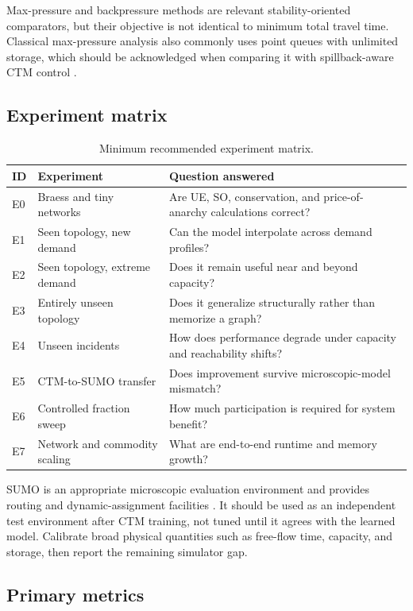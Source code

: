 \documentclass[11pt]{article}
\begin{document}
Max-pressure and backpressure methods are relevant stability-oriented comparators, but
their objective is not identical to minimum total travel time.  Classical max-pressure
analysis also commonly uses point queues with unlimited storage, which should be
acknowledged when comparing it with spillback-aware CTM control \citep{varaiya2013}.

\subsection{Experiment matrix}

\begin{table}[ht]
\centering
\caption{Minimum recommended experiment matrix.}
\label{tab:experiments}
\begin{tabularx}{\textwidth}{@{}p{}p{}X@{}}
\toprule
ID & Experiment & Question answered \\
\midrule
E0 & Braess and tiny networks & Are UE, SO, conservation, and price-of-anarchy calculations correct? \\
E1 & Seen topology, new demand & Can the model interpolate across demand profiles? \\
E2 & Seen topology, extreme demand & Does it remain useful near and beyond capacity? \\
E3 & Entirely unseen topology & Does it generalize structurally rather than memorize a graph? \\
E4 & Unseen incidents & How does performance degrade under capacity and reachability shifts? \\
E5 & CTM-to-SUMO transfer & Does improvement survive microscopic-model mismatch? \\
E6 & Controlled fraction sweep & How much participation is required for system benefit? \\
E7 & Network and commodity scaling & What are end-to-end runtime and memory growth? \\
\bottomrule
\end{tabularx}
\end{table}

SUMO is an appropriate microscopic evaluation environment and provides routing and
dynamic-assignment facilities \citep{lopez2018}.  It should be used as an independent
test environment after CTM training, not tuned until it agrees with the learned model.
Calibrate broad physical quantities such as free-flow time, capacity, and storage, then
report the remaining simulator gap.

\subsection{Primary metrics}
\end{document}
